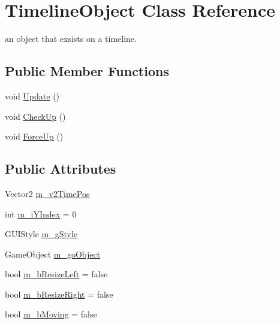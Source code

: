 \hypertarget{class_timeline_object}{}\section{Timeline\+Object Class Reference}
\label{class_timeline_object}


an object that exsists on a timeline.  


\subsection*{Public Member Functions}
\begin{DoxyCompactItemize}
\item 
void \mbox{\hyperlink{class_timeline_object_a189eeb9fdfdd4eed9ce48c7424243077}{Update}} ()
\item 
void \mbox{\hyperlink{class_timeline_object_acb9f150666346f219069ff74dcb65bde}{Check\+Up}} ()
\item 
void \mbox{\hyperlink{class_timeline_object_a9ca00ac2dd3e0e5a5bbefb9c04623c49}{Force\+Up}} ()
\end{DoxyCompactItemize}
\subsection*{Public Attributes}
\begin{DoxyCompactItemize}
\item 
Vector2 \mbox{\hyperlink{class_timeline_object_a5e154851ddf5555e215918eaaf9090e8}{m\+\_\+v2\+Time\+Pos}}
\item 
int \mbox{\hyperlink{class_timeline_object_ac6265747bd860e2a215da19c8ffbc45e}{m\+\_\+i\+Y\+Index}} = 0
\item 
G\+U\+I\+Style \mbox{\hyperlink{class_timeline_object_aa948d48e3b99e0430b96b886953d8652}{m\+\_\+g\+Style}}
\item 
Game\+Object \mbox{\hyperlink{class_timeline_object_acff17e517d9966b24e84f4f0890a50fe}{m\+\_\+go\+Object}}
\item 
bool \mbox{\hyperlink{class_timeline_object_a32520582f2dc8dd1e71f5b7cd216e661}{m\+\_\+b\+Resize\+Left}} = false
\item 
bool \mbox{\hyperlink{class_timeline_object_a5fdc3664e670658619c70fc5c7350f12}{m\+\_\+b\+Resize\+Right}} = false
\item 
bool \mbox{\hyperlink{class_timeline_object_a9f46974d770dbf4a83bb2e1dc4177a6f}{m\+\_\+b\+Moving}} = false
\end{DoxyCompactItemize}


